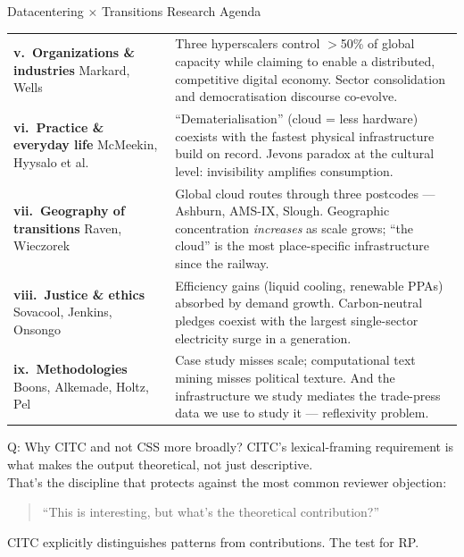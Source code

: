 \documentclass[aspectratio=169,11pt]{beamer}
\begin{document}
\begin{frame}{%
  \enspace Datacentering × Transitions Research Agenda}
\begin{tabularx}{\linewidth}{@{}p{3.4cm}X@{}}
\scriptsize\textbf{v.\ Organizations \& industries}
\newline\textcolor{dcgray}{\tiny Markard, Wells}
&
\tiny Three hyperscalers control $>$50\% of global capacity while claiming to enable a distributed, competitive digital economy. Sector consolidation and democratisation discourse co-evolve. \\[0.3em]

\scriptsize\textbf{vi.\ Practice \& everyday life}
\newline\textcolor{dcgray}{\tiny McMeekin, Hyysalo et al.}
&
\tiny ``Dematerialisation'' (cloud = less hardware) coexists with the fastest physical infrastructure build on record. Jevons paradox at the cultural level: invisibility amplifies consumption. \\[0.3em]

\scriptsize\textbf{vii.\ Geography of transitions}
\newline\textcolor{dcgray}{\tiny Raven, Wieczorek}
&
\tiny Global cloud routes through three postcodes — Ashburn, AMS-IX, Slough. Geographic concentration \textit{increases} as scale grows; ``the cloud'' is the most place-specific infrastructure since the railway. \\[0.3em]

\scriptsize\textbf{viii.\ Justice \& ethics}
\newline\textcolor{dcgray}{\tiny Sovacool, Jenkins, Onsongo}
&
\tiny Efficiency gains (liquid cooling, renewable PPAs) absorbed by demand growth. Carbon-neutral pledges coexist with the largest single-sector electricity surge in a generation. \\[0.3em]

\scriptsize\textbf{ix.\ Methodologies}
\newline\textcolor{dcgray}{\tiny Boons, Alkemade, Holtz, Pel}
&
\tiny Case study misses scale; computational text mining misses political texture. And the infrastructure we study mediates the trade-press data we use to study it — reflexivity problem. \\
\bottomrule
\end{tabularx}
\end{frame}

\begin{frame}[noframenumbering]{\enspace Q: Why CITC and not CSS more broadly?}
\footnotesize
CITC's lexical-framing requirement is what makes the output theoretical, not just descriptive.\\[0.5em]
That's the discipline that protects against the most common reviewer objection:\\[0.3em]
\begin{quote}
  ``This is interesting, but what's the theoretical contribution?''
\end{quote}
\vspace{0.3em}
CITC explicitly distinguishes patterns from contributions. The test for RP.
\end{frame}
\end{document}
